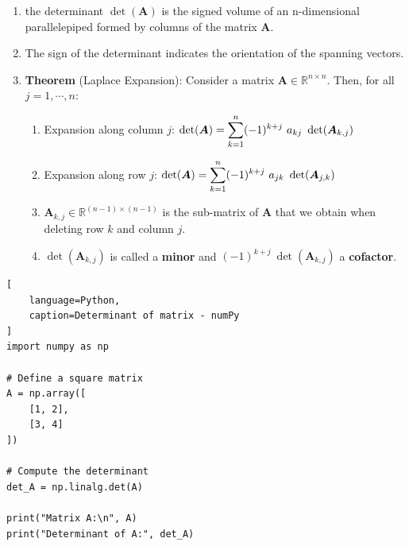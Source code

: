 \begin{enumerate}
    \item the determinant $\det(\bm{A})$ is the signed volume of an n-dimensional parallelepiped formed by columns of the matrix $\bm{A}$.
    \hfill \cite{mfml/book/mml/Deisenroth-Faisal-Ong}

    \item The sign of the determinant indicates the orientation of the spanning vectors.
    \hfill \cite{mfml/book/mml/Deisenroth-Faisal-Ong}

    \item \textbf{Theorem} (Laplace Expansion): Consider a matrix $\bm{A} \in \mathbb{R}^{n\times n}$. Then, for all $j = 1, \cdots , n$:
    \hfill \cite{mfml/book/mml/Deisenroth-Faisal-Ong}
    \begin{enumerate}
        \item Expansion along column $j$: 
        $
            \det(\bm{A}) = \displaystyle\sum^n _{k=1} (-1)^{k+j}\  a_{kj}\ \det(\bm{A}_{k,j} )
        $
        \hfill \cite{mfml/book/mml/Deisenroth-Faisal-Ong}

        \item Expansion along row $j$:
        $
            \det(\bm{A}) = \displaystyle\sum^n _{k=1} (-1)^{k+j}\  a_{jk}\ \det(\bm{A}_{j,k} )
        $
        \hfill \cite{mfml/book/mml/Deisenroth-Faisal-Ong}

        \item $\bm{A}_{k,j} \in \mathbb{R}^{(n-1)\times(n-1)}$ is the sub-matrix of $\bm{A}$ that we obtain when deleting row $k$ and column $j$.
        \hfill \cite{mfml/book/mml/Deisenroth-Faisal-Ong}

        \item $\det(\bm{A}_{k,j} )$ is called a \textbf{minor} and $(-1)^{k+j}\ \det(\bm{A}_{k,j} )$ a \textbf{cofactor}.
        \hfill \cite{mfml/book/mml/Deisenroth-Faisal-Ong}
    \end{enumerate}

\end{enumerate}



\begin{lstlisting}[
    language=Python,
    caption=Determinant of matrix - numPy
]
import numpy as np

# Define a square matrix
A = np.array([
    [1, 2],
    [3, 4]
])

# Compute the determinant
det_A = np.linalg.det(A)

print("Matrix A:\n", A)
print("Determinant of A:", det_A)
\end{lstlisting}




